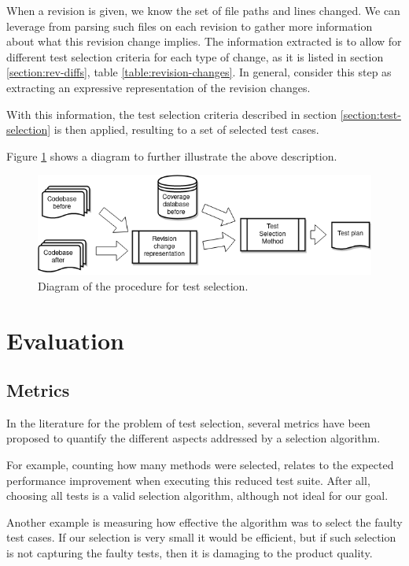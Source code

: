 \documentclass{article}
\begin{document}
When a revision is given, we know the set of file paths and lines changed. We can leverage from parsing such files on each revision to gather more information about what this revision change implies. The information extracted is to allow for different test selection criteria for each type of change, as it is listed in section \ref{section:rev-diffs}, table \ref{table:revision-changes}. In general, consider this step as extracting an expressive representation of the revision changes.

With this information, the test selection criteria described in section \ref{section:test-selection} is then applied, resulting to a set of selected test cases.

Figure \ref{fig:testselection} shows a diagram to further illustrate the above description.
\begin{figure}[H]
  \includegraphics[width=\textwidth]{images/testselection.png}
  \caption{Diagram of the procedure for test selection.}
  \label{fig:testselection}
\end{figure}

\section{Evaluation}\label{section:evaluation}
\subsection{Metrics}
In the literature for the problem of test selection, several metrics have been proposed to quantify the different aspects addressed by a selection algorithm.

For example, counting how many methods were selected, relates to the expected performance improvement when executing this reduced test suite. After all, choosing all tests is a valid selection algorithm, although not ideal for our goal.

Another example is measuring how effective the algorithm was to select the faulty test cases. If our selection is very small it would be efficient, but if such selection is not capturing the faulty tests, then it is damaging to the product quality.
\end{document}
